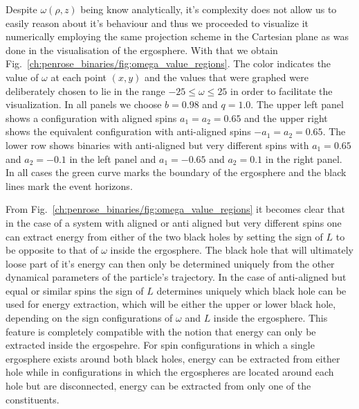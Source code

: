 Despite $\omega(\rho,z)$ being know analytically, it's complexity does not allow us to easily reason about it's behaviour and thus we proceeded to visualize it numerically employing the same projection scheme in the Cartesian plane as was done in the visualisation of the ergosphere. With that we obtain Fig.~\ref{ch:penrose_binaries/fig:omega_value_regions}. The color indicates the value of $\omega$ at each point $(x,y)$ and the values that were graphed were deliberately chosen to lie in the range $-25 \leq \omega \leq 25$ in order to facilitate the visualization. In all panels we choose $b=0.98$ and $q=1.0$. The upper left panel shows a configuration with aligned spins $a_1=a_2=0.65$ and the upper right shows the equivalent configuration with anti-aligned spins $-a_1=a_2=0.65$. The lower row shows binaries with anti-aligned but very different spins with $a_1=0.65$ and $a_2=-0.1$ in the left panel and $a_1=-0.65$ and $a_2 = 0.1$ in the right panel. In all cases the green curve marks the boundary of the ergosphere and the black lines mark the event horizons.

From Fig.~\ref{ch:penrose_binaries/fig:omega_value_regions} it becomes clear that in the case of a system with aligned or anti aligned but very different spins one can extract energy from either of the two black holes by setting the sign of $L$ to be opposite to that of $\omega$ inside the ergosphere. The black hole that will ultimately loose part of it's energy can then only be determined uniquely from the other dynamical parameters of the particle's trajectory. In the case of anti-aligned but equal or similar spins the sign of $L$ determines uniquely which black hole can be used for energy extraction, which will be either the upper or lower black hole, depending on the sign configurations of $\omega$ and $L$ inside the ergosphere. This feature is completely compatible with the notion that energy can only be extracted inside the ergospehre. For spin configurations in which a single ergosphere exists around both black holes, energy can be extracted from either hole while in configurations in which the ergospheres are located around each hole but are disconnected, energy can be extracted from only one of the constituents.

